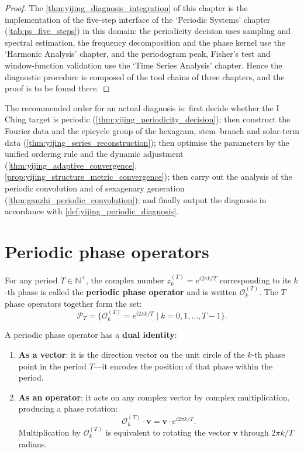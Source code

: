 \begin{proof}
The \cref{thm:yijing_diagnosis_integration} of this chapter is the implementation of the five-step interface of the `Periodic Systems' chapter (\cref{tab:ps_five_steps}) in this domain:
the periodicity decision uses sampling and spectral estimation, the frequency decomposition and the phase kernel use the `Harmonic Analysis' chapter, and the periodogram peak, Fisher's test and
window-function validation use the `Time Series Analysis' chapter. Hence the diagnostic procedure is composed of the tool chains of three chapters, and the proof is to be found there.
\end{proof}

\begin{remark}\label{rem:yijing_integration_order}
The recommended order for an actual diagnosis is: first decide whether the I Ching target is periodic (\cref{thm:yijing_periodicity_decision}); then construct the Fourier data and the epicycle group of the hexagram, stem--branch and solar-term data (\cref{thm:yijing_series_reconstruction}); then optimise the parameters by the unified ordering rule and the dynamic adjustment (\cref{thm:yijing_adaptive_convergence}, \cref{prop:yijing_structure_metric_convergence}); then carry out the analysis of the periodic convolution and of sexagenary generation (\cref{thm:ganzhi_periodic_convolution}); and finally output the diagnosis in accordance with \cref{def:yijing_periodic_diagnosis}.
\end{remark}

\section{Periodic phase operators}

\begin{definition}\label{def:PPO_yijing}
For any period $T \in \mathbb{N}^+$, the complex number $z_k^{(T)} = e^{i2\pi k/T}$ corresponding to its $k$-th phase is called the \textbf{periodic phase operator} and is written $\mathcal{O}_k^{(T)}$. The $T$ phase operators together form the set:
\[
\mathcal{P}_T = \{\mathcal{O}_k^{(T)} = e^{i2\pi k/T} \mid k = 0, 1, \dots, T-1\}.
\]

A periodic phase operator has a \textbf{dual identity}:
\begin{enumerate}[label=(\roman*)]
    \item \textbf{As a vector}: it is the direction vector on the unit circle of the $k$-th phase point in the period $T$---it encodes the position of that phase within the period.
    \item \textbf{As an operator}: it acts on any complex vector by complex multiplication, producing a phase rotation:
    \[
    \mathcal{O}_k^{(T)} \cdot \mathbf{v} = \mathbf{v} \cdot e^{i2\pi k/T}.
    \]
    Multiplication by $\mathcal{O}_k^{(T)}$ is equivalent to rotating the vector $\mathbf{v}$ through $2\pi k/T$ radians.
\end{enumerate}
\end{definition}

